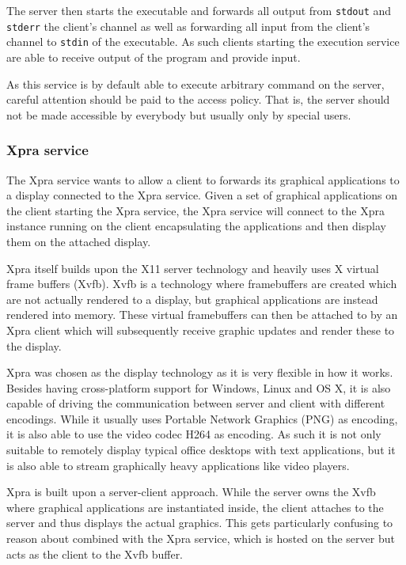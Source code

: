 The server then starts the executable and forwards all output from \lstinline{stdout} and \lstinline{stderr} the client's channel as well as forwarding all input from the client's channel to \lstinline{stdin} of the executable.
As such clients starting the execution service are able to receive output of the program and provide input.

As this service is by default able to execute arbitrary command on the server, careful attention should be paid to the access policy.
That is, the server should not be made accessible by everybody but usually only by special users.

\subsubsection{Xpra service}
\label{sec:xpra-service}

The Xpra service wants to allow a client to forwards its graphical applications to a display connected to the Xpra service.
Given a set of graphical applications on the client starting the Xpra service, the Xpra service will connect to the Xpra instance running on the client encapsulating the applications and then display them on the attached display.

Xpra itself builds upon the X11 server technology and heavily uses X virtual frame buffers (Xvfb).
Xvfb is a technology where framebuffers are created which are not actually rendered to a display, but graphical applications are instead rendered into memory.
These virtual framebuffers can then be attached to by an Xpra client which will subsequently receive graphic updates and render these to the display.

Xpra was chosen as the display technology as it is very flexible in how it works.
Besides having cross-platform support for Windows, Linux and OS X, it is also capable of driving the communication between server and client with different encodings.
While it usually uses Portable Network Graphics (PNG) as encoding, it is also able to use the video codec H264 as encoding.
As such it is not only suitable to remotely display typical office desktops with text applications, but it is also able to stream graphically heavy applications like video players.

Xpra is built upon a server-client approach.
While the server owns the Xvfb where graphical applications are instantiated inside, the client attaches to the server and thus displays the actual graphics.
This gets particularly confusing to reason about combined with the Xpra service, which is hosted on the server but acts as the client to the Xvfb buffer.


